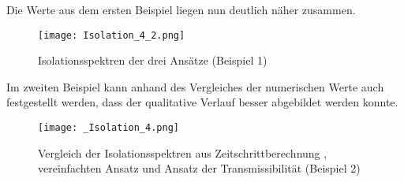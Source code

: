 Die Werte aus dem ersten Beispiel liegen nun deutlich näher zusammen.

\begin{figure}[H]
    \centering
    \texttt{[image: Isolation\_4\_2.png]}
    \caption{Isolationsspektren der drei Ansätze (Beispiel 1)}
    \label{fig:Isolation2}
\end{figure}


Im zweiten Beispiel kann anhand des Vergleiches der numerischen Werte auch festgestellt werden, dass der qualitative Verlauf besser abgebildet werden konnte.

\begin{figure}[H]
    \centering
    \texttt{[image: \_Isolation\_4.png]}
    \caption{Vergleich der Isolationsspektren aus Zeitschrittberechnung \cite{Isemann}, vereinfachten Ansatz und Ansatz der Transmissibilität (Beispiel 2)}
    \label{fig:Isolation2}
\end{figure}

\pagebreak